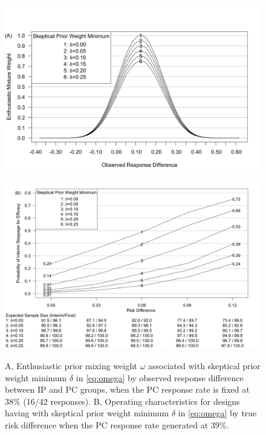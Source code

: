 \documentclass[12pt]{article}
\begin{document}
\begin{figure}[htbp]
\begin{center}
\includegraphics[width=6in]{./figures/3-part-compatibility-2.png}
   \includegraphics[width=6in]{./figures/figure6.png}
    \caption{A, Enthusiastic prior mixing weight $\omega$ associated with skeptical prior weight minimum $\delta$ in \eqref{eq:omega} by observed response difference between IP and PC groups, when the PC response rate is fixed at $38\%$ (16/42 responses). B, Operating characteristics for designs having with skeptical prior weight minimum $\delta$ in \eqref{eq:omega} by true risk difference when the PC response rate generated at $39\%$.}
\label{fig:ex2varyomega}
 \end{center}
\end{figure}
\end{document}
